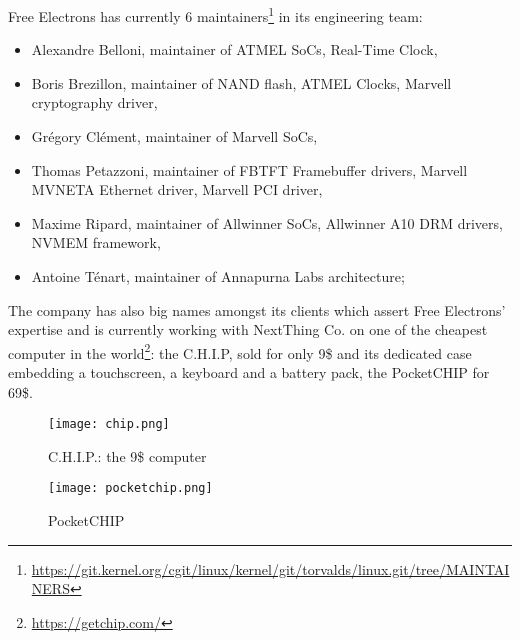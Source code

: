 Free Electrons has currently 6 maintainers\footnote{\url{https://git.kernel.org/cgit/linux/kernel/git/torvalds/linux.git/tree/MAINTAINERS}} in its engineering team:
\begin{itemize}
\item Alexandre Belloni, maintainer of ATMEL SoCs, Real-Time Clock,
\item Boris Brezillon, maintainer of NAND flash, ATMEL Clocks, Marvell cryptography driver,
\item Grégory Clément, maintainer of Marvell SoCs,
\item Thomas Petazzoni, maintainer of FBTFT Framebuffer drivers, Marvell MVNETA Ethernet driver, Marvell PCI driver,
\item Maxime Ripard, maintainer of Allwinner SoCs, Allwinner A10 DRM drivers, NVMEM framework,
\item Antoine Ténart, maintainer of Annapurna Labs architecture;
\end{itemize}

The company has also big names amongst its clients which assert Free Electrons' expertise and is currently working with NextThing Co. on one of the cheapest computer in the world\footnote{\url{https://getchip.com/}}: the C.H.I.P, sold for only 9\$ and its dedicated case embedding a touchscreen, a keyboard and a battery pack, the PocketCHIP for 69\$.

\begin{figure}[H]
  \centering
  \begin{minipage}[b]{0.45\textwidth}
    \texttt{[image: chip.png]}
    \caption{C.H.I.P.: the 9\$ computer}
  \end{minipage}
  \hfill
  \begin{minipage}[b]{0.45\textwidth}
    \centerline{\texttt{[image: pocketchip.png]}}
    \caption{PocketCHIP}
  \end{minipage}
\end{figure}
